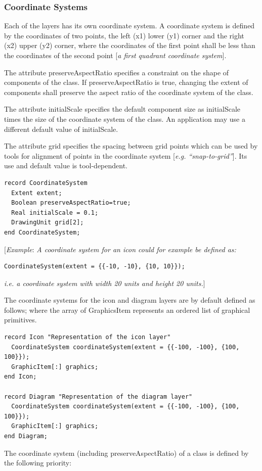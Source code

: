 \documentclass[10pt,a4paper]{report}
\def\doublelabel#1{\label{#1}}
\begin{document}
\subsubsection{Coordinate Systems}\doublelabel{coordinate-systems}

Each of the layers has its own coordinate system. A coordinate system is
defined by the coordinates of two points, the left (x1) lower (y1)
corner and the right (x2) upper (y2) corner, where the coordinates of
the first point shall be less than the coordinates of the second point
{[}\emph{a first quadrant coordinate system}{]}.

The attribute preserveAspectRatio specifies a constraint on the shape of
components of the class. If preserveAspectRatio is true, changing the
extent of components shall preserve the aspect ratio of the coordinate
system of the class.

The attribute initialScale specifies the default component size as
initialScale times the size of the coordinate system of the class. An
application may use a different default value of initialScale.

The attribute grid specifies the spacing between grid points which can
be used by tools for alignment of points in the coordinate system
{[}\emph{e.g. ``snap-to-grid''}{]}. Its use and default value is
tool-dependent.

\begin{lstlisting}[language=modelica]
record CoordinateSystem
  Extent extent;
  Boolean preserveAspectRatio=true;
  Real initialScale = 0.1;
  DrawingUnit grid[2];
end CoordinateSystem;
\end{lstlisting}
{[}\emph{Example}: \emph{A coordinate system for an icon could for
example be defined as:}
\begin{lstlisting}[language=modelica]
CoordinateSystem(extent = {{-10, -10}, {10, 10}});
\end{lstlisting}
\emph{i.e. a coordinate system with width 20 units and height 20
units.}{]}

The coordinate systems for the icon and diagram layers are by default
defined as follows; where the array of GraphicsItem represents an
ordered list of graphical primitives.

\begin{lstlisting}[language=modelica]
record Icon "Representation of the icon layer"
  CoordinateSystem coordinateSystem(extent = {{-100, -100}, {100, 100}});
  GraphicItem[:] graphics;
end Icon;

record Diagram "Representation of the diagram layer"
  CoordinateSystem coordinateSystem(extent = {{-100, -100}, {100, 100}});
  GraphicItem[:] graphics;
end Diagram;
\end{lstlisting}
The coordinate system (including preserveAspectRatio) of a class is
defined by the following priority:
\end{document}

